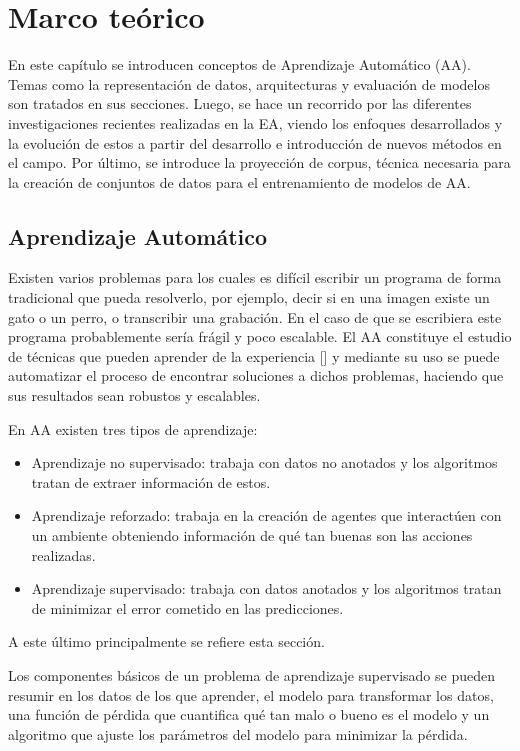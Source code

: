 \chapter{Marco teórico}\label{chapter:background}

En este capítulo se introducen conceptos de Aprendizaje Automático (AA). Temas
como la representación de datos, arquitecturas y evaluación de modelos son tratados en sus secciones.
Luego, se hace un recorrido por las diferentes investigaciones recientes realizadas en la EA, viendo
los enfoques desarrollados y la evolución de estos a partir del desarrollo e introducción de nuevos métodos en el
campo. Por último, se introduce la proyección de corpus, técnica necesaria para la creación de conjuntos 
de datos para el entrenamiento de modelos de AA.

\section{Aprendizaje Automático}

Existen varios problemas para los cuales es difícil escribir un programa de forma tradicional que pueda
resolverlo, por ejemplo, decir si en una imagen existe un gato o un perro, o transcribir una grabación. En el caso
de que se escribiera este programa probablemente sería frágil y poco escalable. El AA constituye el 
estudio de técnicas que pueden aprender de la experiencia [\cite{d2l}] y mediante su uso 
se puede automatizar el proceso de encontrar soluciones a dichos problemas, haciendo que sus resultados sean 
robustos y escalables. 

En AA existen tres tipos de aprendizaje:
\begin{itemize}
	\item Aprendizaje no supervisado: trabaja con datos no anotados y los algoritmos tratan de 
	extraer información de estos.
	\item Aprendizaje reforzado: trabaja en la creación de agentes que interactúen con 
	un ambiente obteniendo información de qué tan buenas son las acciones realizadas.
	\item Aprendizaje supervisado: trabaja con datos anotados y los algoritmos tratan de minimizar
	el error cometido en las predicciones.
\end{itemize}
A este último principalmente se refiere esta sección.

Los componentes básicos de un problema de aprendizaje supervisado se pueden resumir en los datos de los que 
aprender, el modelo para transformar los datos, una función de pérdida que cuantifica qué tan malo o bueno es el 
modelo y un algoritmo que ajuste los parámetros del modelo para minimizar la pérdida.

